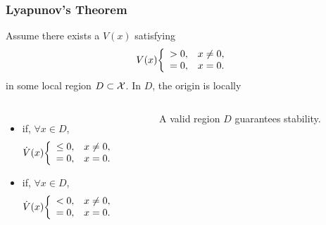 \begin{frame}
  \frametitle{Lyapunov's Theorem}
  Assume there exists a  $V(x)$ satisfying
  \begin{align*}
    V(x) \bigg\{\begin{array}{l l}
      > 0,& x \ne 0,\\
      = 0,& x = 0.
    \end{array}
  \end{align*}
  in some local region $D \subset \mathcal{X}$. In $D$, the origin is locally
  \begin{columns}
    \column{2.5in}
    
    \begin{itemize}
    \item {} if, $\forall x \in D$,
      \begin{align*}
        {\dot V}(x) \bigg\{\begin{array}{l l}
        \leq 0,& x \ne 0,\\
        = 0,& x = 0.
        \end{array}
      \end{align*}
    \item {} if, $\forall x \in D$,
      \begin{align*}
        {\dot V}(x) \bigg\{\begin{array}{l l}
        < 0,& x \ne 0,\\
        = 0,& x = 0.
        \end{array}
      \end{align*}
    \end{itemize}
    \column{1.5in}
    \begin{figure}
      \centering
      \def\svgwidth{0.75\columnwidth}
      
      \caption{A valid region $D$ guarantees stability.}
    \end{figure}
  \end{columns}
\end{frame}

